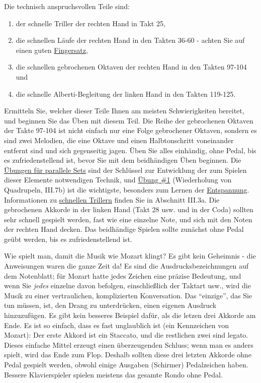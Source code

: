 Die technisch anspruchsvollen Teile sind:

\begin{enumerate}[label={\arabic*.}] 
 \item der schnelle Triller der rechten Hand in Takt 25,
 \item die schnellen Läufe der rechten Hand in den Takten 36-60 - achten Sie auf einen guten \hyperref[c1ii18]{Fingersatz},
 \item die schnellen gebrochenen Oktaven der rechten Hand in den Takten 97-104 und 
 \item die schnelle Alberti-Begleitung der linken Hand in den Takten 119-125.
\end{enumerate}

Ermitteln Sie, welcher dieser Teile Ihnen am meisten Schwierigkeiten bereitet, und beginnen Sie das Üben mit diesem Teil.
Die Reihe der gebrochenen Oktaven der Takte 97-104 ist nicht einfach nur eine Folge gebrochener Oktaven, sondern es sind zwei Melodien, die eine Oktave und einen Halbtonschritt voneinander entfernt sind und sich gegenseitig jagen.
Üben Sie alles einhändig, ohne Pedal, bis es zufriedenstellend ist, bevor Sie mit dem beidhändigen Üben beginnen.
Die \hyperref[c1iii7b]{Übungen für parallele Sets} sind der Schlüssel zur Entwicklung der zum Spielen dieser Elemente notwendigen Technik, und \hyperref[c1iii7b1]{Übung \#1} (Wiederholung von Quadrupeln, III.7b) ist die wichtigste, besonders zum Lernen der \hyperref[c1ii14]{Entspannung}.
Informationen zu \hyperref[c1iii3]{schnellen Trillern} finden Sie in Abschnitt III.3a.
Die gebrochenen Akkorde in der linken Hand (Takt 28 usw. und in der Coda) sollten sehr schnell gespielt werden, fast wie eine einzelne Note, und sich mit den Noten der rechten Hand decken.
Das beidhändige Spielen sollte zunächst ohne Pedal geübt werden, bis es zufriedenstellend ist.

Wie spielt man, damit die Musik wie Mozart klingt?
Es gibt kein Geheimnis - die Anweisungen waren die ganze Zeit da!
Es sind die Ausdrucksbezeichnungen auf dem Notenblatt; für Mozart hatte jedes Zeichen eine präzise Bedeutung, und wenn Sie \textit{jedes} einzelne davon befolgen, einschließlich der Taktart usw., wird die Musik zu einer vertraulichen, komplizierten Konversation.
Das \enquote{einzige}, das Sie tun müssen, ist, den Drang zu unterdrücken, einen eigenen Ausdruck hinzuzufügen.
Es gibt kein besseres Beispiel dafür, als die letzen drei Akkorde am Ende.
Es ist so einfach, dass es fast unglaublich ist (ein Kennzeichen von Mozart): Der erste Akkord ist ein Staccato, und die restlichen zwei sind legato.
Dieses einfache Mittel erzeugt einen überzeugenden Schluss; wenn man es anders spielt, wird das Ende zum Flop.
Deshalb sollten diese drei letzten Akkorde ohne Pedal gespielt werden, obwohl einige Ausgaben (Schirmer) Pedalzeichen haben.
Bessere Klavierspieler spielen meistens das gesamte Rondo ohne Pedal.

